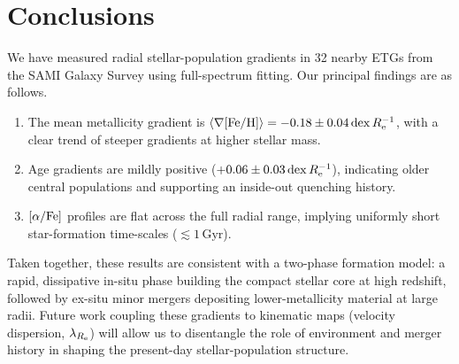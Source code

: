 \section{Conclusions}
\label{sec:conclusions}

We have measured radial stellar-population gradients in 32 nearby
ETGs from the SAMI Galaxy Survey using full-spectrum fitting.
Our principal findings are as follows.

\begin{enumerate}
  \item The mean metallicity gradient is
        $\langle\nabla[\mathrm{Fe/H}]\rangle = -0.18 \pm 0.04\,\mathrm{dex}\,R_{\mathrm{e}}^{-1}$,
        with a clear trend of steeper gradients at higher stellar
        mass.
  \item Age gradients are mildly positive
        ($+0.06 \pm 0.03\,\mathrm{dex}\,R_{\mathrm{e}}^{-1}$), indicating
        older central populations and supporting an inside-out
        quenching history.
  \item $[\alpha/\mathrm{Fe}]$ profiles are flat across the full radial range,
        implying uniformly short star-formation time-scales
        ($\lesssim 1\,\mathrm{Gyr}$).
\end{enumerate}

Taken together, these results are consistent with a two-phase
formation model: a rapid, dissipative in-situ phase building the
compact stellar core at high redshift, followed by ex-situ minor
mergers depositing lower-metallicity material at large radii.
Future work coupling these gradients to kinematic maps (velocity
dispersion, $\lambda_{R_{\mathrm{e}}}$) will allow us to disentangle the role of
environment and merger history in shaping the present-day
stellar-population structure.

